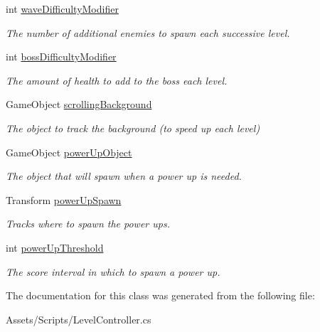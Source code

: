 \begin{DoxyCompactItemize}
\mbox{\label{class_level_controller_a7a4d99d10f9128d12efb3b10cdeee921}} 
int \mbox{\hyperlink{class_level_controller_a7a4d99d10f9128d12efb3b10cdeee921}{wave\+Difficulty\+Modifier}}
\begin{DoxyCompactList}\small\item\em The number of additional enemies to spawn each successive level. \end{DoxyCompactList}\item 
\mbox{\label{class_level_controller_aba68593c9e9aa85e67d95232aa91ad0b}} 
int \mbox{\hyperlink{class_level_controller_aba68593c9e9aa85e67d95232aa91ad0b}{boss\+Difficulty\+Modifier}}
\begin{DoxyCompactList}\small\item\em The amount of health to add to the boss each level. \end{DoxyCompactList}\item 
\mbox{\label{class_level_controller_a09cc9c55bc33be5c9c9861f1291f2070}} 
Game\+Object \mbox{\hyperlink{class_level_controller_a09cc9c55bc33be5c9c9861f1291f2070}{scrolling\+Background}}
\begin{DoxyCompactList}\small\item\em The object to track the background (to speed up each level) \end{DoxyCompactList}\item 
\mbox{\label{class_level_controller_a99291eb24ff2d4f118ae35100ba238d2}} 
Game\+Object \mbox{\hyperlink{class_level_controller_a99291eb24ff2d4f118ae35100ba238d2}{power\+Up\+Object}}
\begin{DoxyCompactList}\small\item\em The object that will spawn when a power up is needed. \end{DoxyCompactList}\item 
\mbox{\label{class_level_controller_a9d1d63a7deb1d44661820a73b806c9bf}} 
Transform \mbox{\hyperlink{class_level_controller_a9d1d63a7deb1d44661820a73b806c9bf}{power\+Up\+Spawn}}
\begin{DoxyCompactList}\small\item\em Tracks where to spawn the power ups. \end{DoxyCompactList}\item 
\mbox{\label{class_level_controller_a4cde6e70afc6404160a2950fa82d3569}} 
int \mbox{\hyperlink{class_level_controller_a4cde6e70afc6404160a2950fa82d3569}{power\+Up\+Threshold}}
\begin{DoxyCompactList}\small\item\em The score interval in which to spawn a power up. \end{DoxyCompactList}\end{DoxyCompactItemize}


The documentation for this class was generated from the following file\+:\begin{DoxyCompactItemize}
\item 
Assets/\+Scripts/Level\+Controller.\+cs\end{DoxyCompactItemize}
